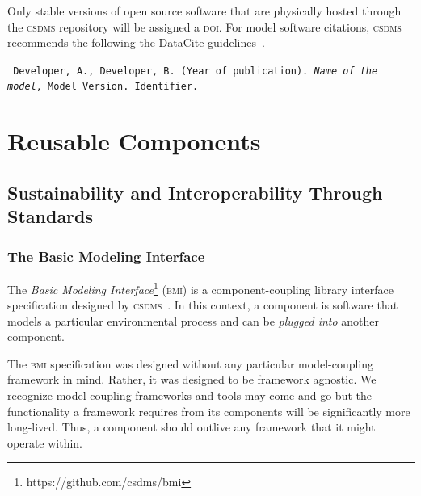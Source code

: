 \documentclass[11pt, oneside]{amsart}
\DeclareRobustCommand{\csdms}{\textsc{csdms}}
\DeclareRobustCommand{\doi}{\textsc{doi}}
\DeclareRobustCommand{\bmi}{\textsc{bmi}}
\begin{document}

Only stable versions of open source
software that are physically hosted through the \csdms{} repository will be
assigned a \doi{}. For model software citations, \csdms{} recommends the
following the DataCite guidelines~\cite{brase2009datacite}.

\begin{shaded}
\leftskip 0.25in
\parindent -0.25in
\tt{
Developer, A., Developer, B. (Year of publication). \emph{Name of the model},
Model Version. Identifier.
}
\end{shaded}

\section{Reusable Components}
\label{sec:reusable}

\subsection{Sustainability and Interoperability Through Standards}

\subsubsection{The Basic Modeling Interface}
\label{sec:bmi}

The \emph{Basic Modeling Interface}\footnote{https://github.com/csdms/bmi}
(\bmi{}) is a component-coupling library
interface specification designed by \csdms~\cite{peckham2012component,
syvitski2014plug}.  In this context, a component is software that models a
particular environmental process and can be \emph{plugged into} another
component.

The \bmi{} specification was designed without any particular model-coupling
framework in mind.  Rather, it was designed to be framework agnostic. We
recognize model-coupling frameworks and tools may come and go but the
functionality a framework requires from its components will be significantly
more long-lived. Thus, a component should outlive any framework that it might
operate within.
\end{document}
